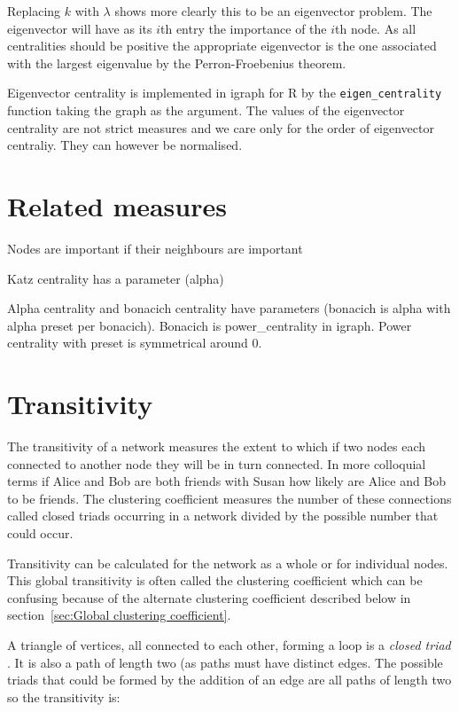   Replacing $k$ with $\lambda$ shows more clearly this to be an eigenvector problem. The eigenvector will have as its $i$th entry the importance of the $i$th node. As all centralities should be positive the appropriate eigenvector is the one associated with the largest eigenvalue by the Perron-Froebenius theorem. 
  
  Eigenvector centrality is implemented in igraph for R by the \texttt{eigen\_centrality} function taking the graph as the argument. The values of the eigenvector centrality are not strict measures and we care only for the order of eigenvector centraliy. They can however be normalised. 
  
 \section{Related measures}
\cite{bonacich1987power}
Nodes are important if their neighbours are important 

Katz centrality has a parameter (alpha)
    
Alpha centrality and bonacich centrality have parameters (bonacich is alpha with alpha preset per bonacich). Bonacich is power\_centrality in igraph. Power centrality with preset is symmetrical around 0.  





\section{Transitivity}
\label{sec:transitivity}
The transitivity of a network measures the extent to which if two nodes each connected to another node they will be in turn connected. In more colloquial terms if Alice and Bob are both friends with Susan how likely are Alice and Bob to be friends. The clustering coefficient measures the number of these connections called closed triads occurring in a network 
divided by the possible number that could occur.

Transitivity can be calculated for the network as a whole or for individual nodes. This global transitivity is often called the clustering coefficient which can be confusing because of the alternate clustering coefficient described below in section~\ref{sec:Global clustering coefficient}. 

A triangle of vertices,  all connected to each other, forming a loop is  a \textit{closed triad} \cite{newman2018networks}. It is also a path of length two (as paths must have distinct edges. The possible triads that could be formed by the addition of an edge are all paths of length two so the transitivity is:

